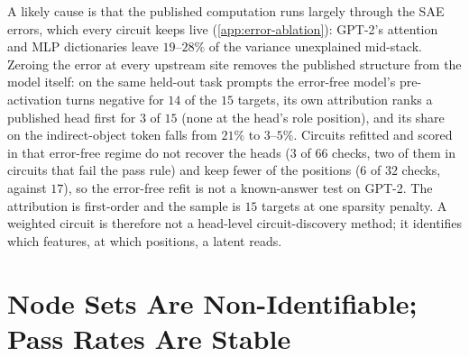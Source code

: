\documentclass[10pt]{article}
\begin{document}
A likely cause is that the published computation runs largely through the SAE errors, which every circuit keeps live (\cref{app:error-ablation}): GPT-2's attention and MLP dictionaries leave $19$--$28\%$ of the variance unexplained mid-stack.
Zeroing the error at every upstream site removes the published structure from the model itself: on the same held-out task prompts the error-free model's pre-activation turns negative for $14$ of the $15$ targets, its own attribution ranks a published head first for $3$ of $15$ (none at the head's role position), and its share on the indirect-object token falls from $21\%$ to $3$--$5\%$.
Circuits refitted and scored in that error-free regime do not recover the heads ($3$ of $66$ checks, two of them in circuits that fail the pass rule) and keep fewer of the positions ($6$ of $32$ checks, against $17$), so the error-free refit is not a known-answer test on GPT-2.
The attribution is first-order and the sample is $15$ targets at one sparsity penalty.
A weighted circuit is therefore not a head-level circuit-discovery method; it identifies which features, at which positions, a latent reads.

\section{Node Sets Are Non-Identifiable; Pass Rates Are Stable}
\label{app:underdetermination}
\label{sec:underdetermination}
\end{document}
